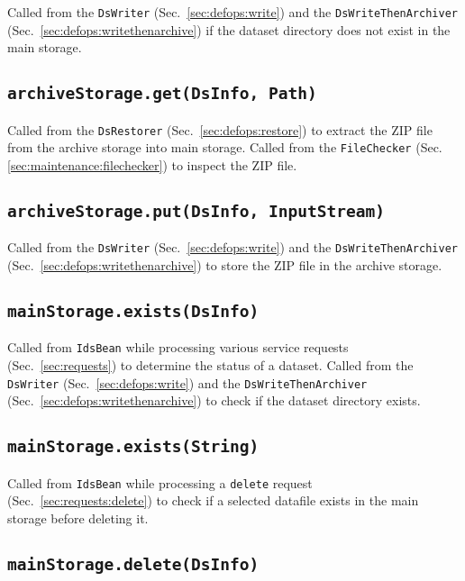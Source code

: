 \documentclass[paper=a4]{scrartcl}
\begin{document}
Called from the \texttt{DsWriter} (Sec.\ \ref{sec:defops:write}) and
the \texttt{DsWriteThenArchiver}
(Sec.\ \ref{sec:defops:writethenarchive}) if the dataset directory
does not exist in the main storage.

\subsection{\texttt{archiveStorage.get(DsInfo, Path)}}

Called from the \texttt{DsRestorer} (Sec.\ \ref{sec:defops:restore})
to extract the ZIP file from the archive storage into main storage.
Called from the \texttt{FileChecker}
(Sec. \ref{sec:maintenance:filechecker}) to inspect the ZIP file.

\subsection{\texttt{archiveStorage.put(DsInfo, InputStream)}}

Called from the \texttt{DsWriter} (Sec.\ \ref{sec:defops:write}) and
the \texttt{DsWriteThenArchiver}
(Sec.\ \ref{sec:defops:writethenarchive}) to store the ZIP file in the
archive storage.

\subsection{\texttt{mainStorage.exists(DsInfo)}}

Called from \texttt{IdsBean} while processing various service requests
(Sec.\ \ref{sec:requests}) to determine the status of a dataset.
Called from the \texttt{DsWriter} (Sec.\ \ref{sec:defops:write}) and
the \texttt{DsWriteThenArchiver}
(Sec.\ \ref{sec:defops:writethenarchive}) to check if the dataset
directory exists.

\subsection{\texttt{mainStorage.exists(String)}}

Called from \texttt{IdsBean} while processing a \texttt{delete}
request (Sec.\ \ref{sec:requests:delete}) to check if a selected
datafile exists in the main storage before deleting it.

\subsection{\texttt{mainStorage.delete(DsInfo)}}
\end{document}
